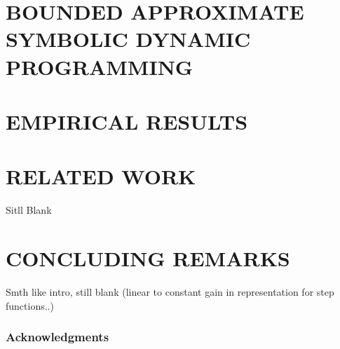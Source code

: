 \documentclass[]{article}
\begin{document}


\section{BOUNDED APPROXIMATE SYMBOLIC DYNAMIC PROGRAMMING}



\section{EMPIRICAL RESULTS}



\section{RELATED WORK}

Sitll Blank


\section{CONCLUDING REMARKS}

Smth like intro, still blank (linear to constant gain in representation for step functions..)


\subsubsection*{Acknowledgments}




\end{document}
